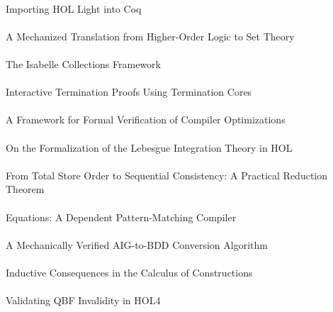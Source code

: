 \documentclass{article}
\begin{document}
\cite{10-keller-importing} \\
Importing {HOL Light} into {Coq} \\

\cite{10-krauss-translation} \\
A Mechanized Translation from Higher-Order Logic to Set Theory \\

\cite{10-lammich-collections} \\
The {Isabelle} Collections Framework \\

\cite{10-manolios-termination} \\
Interactive Termination Proofs Using Termination Cores \\

\cite{10-mansky-optimizations} \\
A Framework for Formal Verification of Compiler Optimizations \\

\cite{10-mhamdi-integration} \\
On the Formalization of the {Lebesgue} Integration Theory in {HOL} \\

\cite{10-cohen-reduction} \\
From Total Store Order to Sequential Consistency: A Practical Reduction Theorem \\

\cite{10-sozeau-equations} \\
{Equations:} A Dependent Pattern-Matching Compiler \\

\cite{10-swords-conversion} \\
A Mechanically Verified {AIG}-to-{BDD} Conversion Algorithm \\

\cite{10-walukiewicz-chrzaszcz-consequences} \\
Inductive Consequences in the {Calculus} of {Constructions} \\

\cite{10-weber-qbf} \\
Validating {QBF} Invalidity in {HOL4} \\
\end{document}
